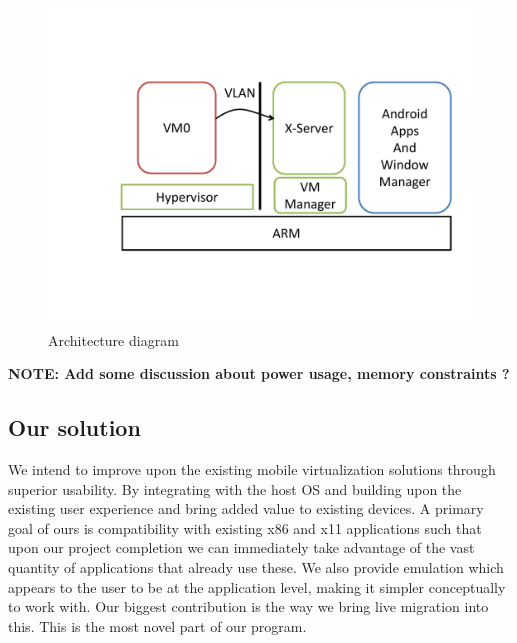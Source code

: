 \begin{figure}[tbh]
\centering
\includegraphics[width=1.0\columnwidth]{arch}
\caption{Architecture diagram}
\label{fig:arch}
\end{figure}

{\bf NOTE: Add some discussion about power usage, memory constraints ? \newline}
\subsection{Our solution}
\label{oursbetter}
We intend to improve upon the existing mobile virtualization solutions through superior usability.  By integrating with the host OS and building upon the existing user experience and bring added value to existing devices.
A primary goal of ours is compatibility with existing x86 and x11 applications such that upon our project completion we can immediately take advantage of the vast quantity of applications that already use these.
We also provide emulation which appears to the user to be at the application level, making it simpler conceptually to work with.
Our biggest contribution is the way we bring live migration into this.  This is the most novel part of our program.

